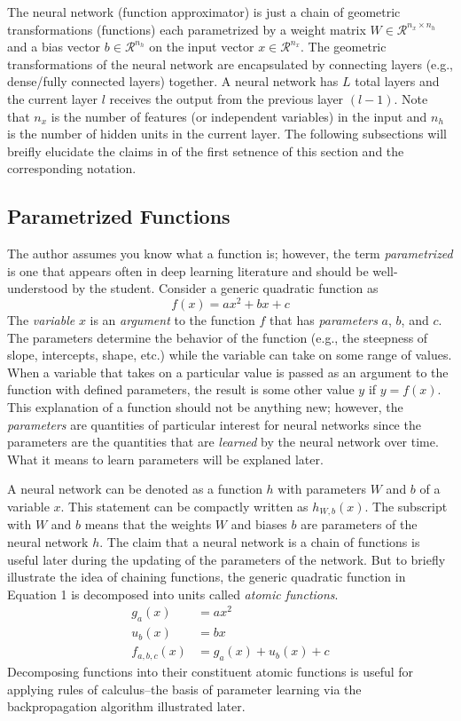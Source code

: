 \documentclass{article}
\begin{document}
\quad The neural network (function approximator) is just a chain of geometric transformations (functions)
each parametrized by a weight matrix $W \in \mathcal{R}^{n_x \times n_h}$ and
a bias vector $b \in \mathcal{R}^{n_h}$ on the input vector $x \in \mathcal{R}^{n_x}$.
The geometric transformations of the neural network are encapsulated by connecting
layers (e.g., dense/fully connected layers) together. A neural network has $L$ total
layers and the current layer $l$ receives the output from the previous layer $(l-1)$.
Note that $n_x$ is the number of features (or independent variables) in the input
and $n_h$ is the number of hidden units in the current layer. The following subsections will
breifly elucidate the claims in of the first setnence of this section and the
corresponding notation.

\subsection{Parametrized Functions}

The author assumes you know what a function is; however, the term \textit{parametrized}
is one that appears often in deep learning literature and should be well-understood by the student.
Consider a generic quadratic function \cite{MathSEVarsParamsArgs2015} as
\begin{equation}
	f(x) = ax^{2} + bx + c
\end{equation}
The \textit{variable} $x$ is an \textit{argument} to the function $f$ that has
\textit{parameters} $a$, $b$, and $c$. The parameters determine the behavior of
the function (e.g., the steepness of slope, intercepts, shape, etc.) while the
variable can take on some range of values. When a variable that takes on a particular
value is passed as an argument to the function with defined parameters, the result
is some other value $y$ if $y = f(x)$. This explanation of a function
should not be anything new; however, the \textit{parameters} are quantities
of particular interest for neural networks since the parameters are the quantities
that are \textit{learned} by the neural network over time. What it means to learn
parameters will be explaned later.

A neural network can be denoted as a function $h$ with parameters $W$
and $b$ of a variable $x$. This statement can be compactly written as
$h_{W, b}(x)$. The subscript with $W$ and $b$
means that the weights $W$ and biases $b$ are parameters of the neural network $h$.
The claim that a neural network is a chain of functions is useful later during
the updating of the parameters of the network. But to briefly illustrate the idea
of chaining functions, the generic quadratic function in Equation 1 is decomposed
into units called \textit{atomic functions}.
\begin{align}
	g_{a}(x)     & = ax^{2}                  \\
	u_{b}(x)     & = bx                      \\
	f_{a,b,c}(x) & = g_{a}(x) + u_{b}(x) + c
\end{align}
Decomposing functions into their constituent atomic functions is useful
for applying rules of calculus--the basis of parameter learning via
the backpropagation algorithm illustrated later.
\end{document}
